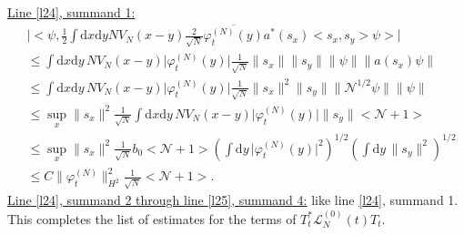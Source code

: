 \documentclass[11pt,a4paper,draft,DIV11]{scrartcl}	%
\newcommand{\di}{\textrm{d}}		%
\newcommand{\Lcal}{\mathcal{L}}		%
\newcommand{\Ncal}{\mathcal{N}}		%
\newcommand{\estlist}[2]{\underline{Line \ref{l#1}, summand #2:}}
\newcommand{\nestlist}[2]{line \ref{l#1}, summand #2}
\newcommand{\Nestlist}[2]{Line \ref{l#1}, summand #2}
\newcommand{\scal}[2]{\big<#1,#2\big>} %
\newcommand{\cc}[1]{\overline{#1}}	%
\newcommand{\norm}[1]{\lVert#1\rVert}	%
\newcommand{\ev}[1]{\big<#1\big>}	%
\newcommand{\ph}{\varphi_t^{(N)}}	%
\newcommand{\dxyNV}{\frac{1}{2}\int \di x\di y N V_N(x-y)} %
\begin{document}
\estlist{24}{1}
\begin{align*}
 & \lvert \scal{\psi}{\dxyNV \frac{2}{\sqrt{N}}\cc{\ph(y)}a^\ast(s_x)\scal{s_x}{s_y}\psi} \rvert \\
& \leq \int \di x\di y\, NV_N(x-y) \lvert \ph(y)\rvert \frac{1}{\sqrt{N}} \norm{s_x} \norm{s_y} \norm{\psi} \norm{a(s_x)\psi} \\
& \leq \int \di x\di y\, NV_N(x-y) \lvert \ph(y)\rvert \frac{1}{\sqrt{N}} \norm{s_x}^2 \norm{s_y} \norm{\Ncal^{1/2}\psi} \norm{\psi} \\
& \leq \sup_x \norm{s_x}^2 \frac{1}{\sqrt{N}} \int \di x\di y\, NV_N(x-y) \lvert \ph(y)\rvert \norm{s_y} \ev{\Ncal+1} \\
& \leq \sup_x \norm{s_x}^2 \frac{1}{\sqrt{N}} b_0 \ev{\Ncal+1} \left( \int \di y\, \lvert \ph(y)\rvert^2 \right)^{1/2} \left( \int \di y\, \norm{s_y}^2 \right)^{1/2} \\
& \leq C\norm{\ph}_{H^2}^2 \frac{1}{\sqrt{N}}\ev{\Ncal+1}.
\end{align*}
\underline{\Nestlist{24}{2} through \nestlist{25}{4}:} like \nestlist{24}{1}.\newline
This completes the list of estimates for the terms of $T^*_t \Lcal_N^{(0)}(t) T_t$.\vspace{1em}
\end{document}
